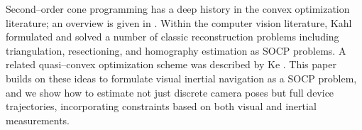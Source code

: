 Second--order cone programming has a deep history in the convex optimization literature; an overview is given in \cite{boyd2008}. Within the computer vision literature, Kahl \cite{kahl2005} formulated and solved a number of classic reconstruction problems including triangulation, resectioning, and homography estimation as SOCP problems. A related quasi--convex optimization scheme was described by Ke \etal \cite{ke2007}. This paper builds on these ideas to formulate visual inertial navigation as a SOCP problem, and we show how to estimate not just discrete camera poses but full device trajectories, incorporating constraints based on both visual and inertial measurements.
